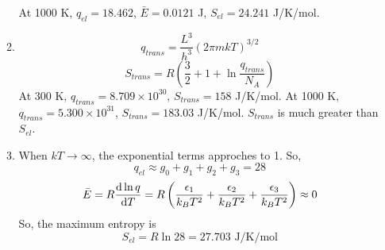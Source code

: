 \begin{solution}
\begin{enumerate}
\begin{enumerate}
                        At 1000 K, $q_{el}=18.462$, $\bar{E}=0.0121$ J, $S_{el}=24.241$ J/K/mol.
                  \item \begin{equation*}
                            q_{trans}=\frac{L^3}{h^3}(2\pi mkT)^{3/2}
                        \end{equation*}
                        \begin{equation*}
                            S_{trans}=R\left(\frac{3}{2}+1+\ln\frac{q_{trans}}{N_A}\right)
                        \end{equation*}
                        At 300 K, $q_{trans}=8.709\times10^{30}$, $S_{trans}=158$ J/K/mol.
                        At 1000 K, $q_{trans}=5.300\times10^{31}$, $S_{trans}=183.03$ J/K/mol.
                        $S_{trans}$ is much greater than $S_{el}$.
                  \item When $kT\rightarrow\infty$, the exponential terms approches to 1. So,
                        \begin{equation*}
                            q_{el}\approx g_0+g_1+g_2+g_3=28
                        \end{equation*}
                        \begin{equation*}
                            \bar{E}=R\frac{\mathrm{d} \ln q}{\mathrm{d} T}=R\left(\frac{\epsilon_1}{k_BT^2}+\frac{\epsilon_2}{k_BT^2}
                            +\frac{\epsilon_3}{k_BT^2}\right)\approx 0
                        \end{equation*}
                        So, the maximum entropy is
                        \begin{equation*}
                            S_{el}=R\ln28=27.703\text{ J/K/mol}
                        \end{equation*}
              \end{enumerate}
    \end{enumerate}
\end{solution}